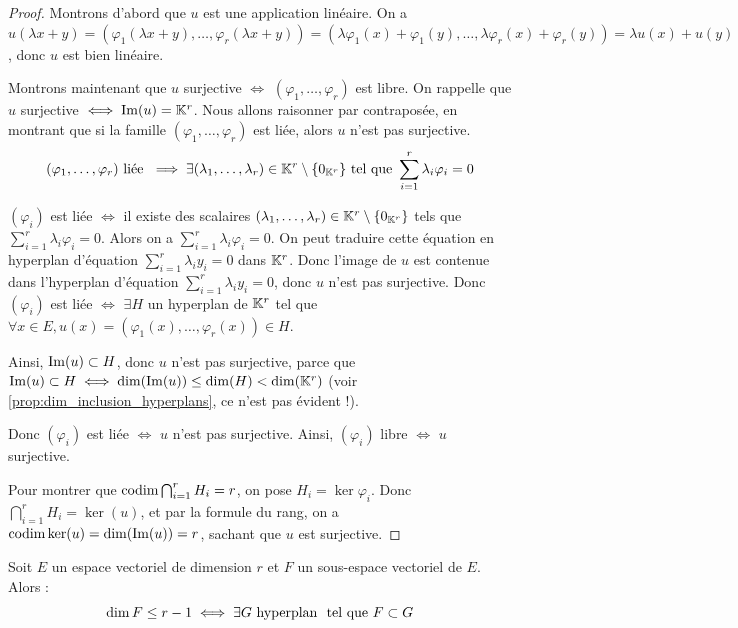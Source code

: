 \documentclass[11pt,a4paper]{report}
\begin{document}
\begin{proof}
    Montrons d'abord que $u$ est une application linéaire. On a $u(\lambda x + y) = (\varphi_1(\lambda x + y), \dots, \varphi_r(\lambda x + y)) = (\lambda \varphi_1(x) + \varphi_1(y), \dots, \lambda \varphi_r(x) + \varphi_r(y)) = \lambda u(x) + u(y)$, donc $u$ est bien linéaire.

    Montrons maintenant que $u$ surjective $\iff$ $(\varphi_1,\dots,\varphi_r)$ est libre. On rappelle que $u$ surjective $\iff \mathrm{Im}(u) = \mathbb{K}^r$. Nous allons raisonner par contraposée, en montrant que si la famille $(\varphi_1,\dots,\varphi_r)$ est liée, alors $u$ n'est pas surjective.
    $$(\varphi_1,\dots,\varphi_r) \text{ liée } \implies \exists (\lambda_1,\dots,\lambda_r) \in \mathbb{K}^r \setminus \{0_{\mathbb{K}^r}\} \text{ tel que } \sum_{i=1}^r \lambda_i \varphi_i = 0$$

    $(\varphi_i)$ est liée $\iff$ il existe des scalaires $(\lambda_1,\dots,\lambda_r) \in \mathbb{K}^r \setminus \{0_{\mathbb{K}^r}\}$ tels que $\sum_{i=1}^r \lambda_i \varphi_i = 0$. Alors on a $\sum_{i=1}^r \lambda_i \varphi_i = 0$. On peut traduire cette équation en hyperplan d'équation $\sum_{i=1}^r \lambda_i y_i = 0$ dans $\mathbb{K}^r$. Donc l'image de $u$ est contenue dans l'hyperplan d'équation $\sum_{i=1}^r \lambda_i y_i = 0$, donc $u$ n'est pas surjective. Donc $(\varphi_i)$ est liée $\iff$ $\exists H$ un hyperplan de $\mathbb{K}^r$ tel que $\forall x \in E, u(x) = (\varphi_1(x), \dots, \varphi_r(x)) \in H$.
    
    Ainsi, $\mathrm{Im}(u) \subset H$, donc $u$ n'est pas surjective, parce que $\mathrm{Im}(u) \subset H \iff \dim(\mathrm{Im}(u)) \le \dim(H) < \dim(\mathbb{K}^r)$ (voir \ref{prop:dim_inclusion_hyperplans}, ce n'est pas évident !).
    
    Donc $(\varphi_i)$ est liée $\iff$ $u$ n'est pas surjective. Ainsi, $(\varphi_i)$ libre $\iff$ $u$ surjective. 

    Pour montrer que $\mathrm{codim} \bigcap_{i=1}^r H_i = r$, on pose $H_i = \ker\varphi_i$. Donc $\bigcap_{i=1}^r H_i = \ker(u)$, et par la formule du rang, on a $\mathrm{codim} \ker(u) = \dim(\mathrm{Im}(u)) = r$, sachant que $u$ est surjective.
\end{proof}

\begin{property}
    \label{prop:dim_inclusion_hyperplans}
    Soit $E$ un espace vectoriel de dimension $r$ et $F$ un sous-espace vectoriel de $E$. Alors :
    $$\dim F \le r-1 \iff \exists G \text{ hyperplan } \text{ tel que } F \subset G$$
\end{property}
\end{document}
